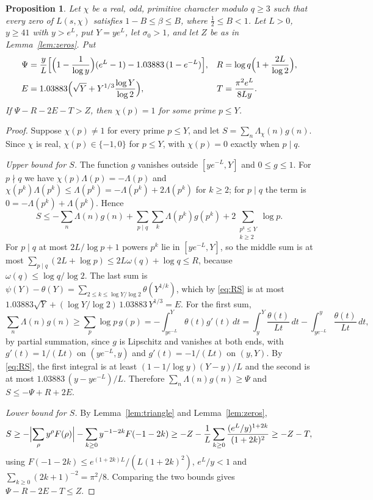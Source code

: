 \documentclass[11pt]{amsart}
\newtheorem{proposition}[theorem]{Proposition}
\theoremstyle{definition}
\theoremstyle{remark}
\numberwithin{equation}{section}
\newcommand{\Lam}{\Lambda_\chi}
\begin{document}
\begin{proposition}\label{prop:criterion}
Let $\chi$ be a real, odd, primitive character modulo $q\ge3$ such that every zero of $L(s,\chi)$ satisfies $1-B\le\beta\le B$, where $\tfrac12\le B<1$. Let $L>0$, $y\ge41$ with $y>e^L$, put $Y=ye^L$, let $\sigma_0>1$, and let $Z$ be as in Lemma~\ref{lem:zeros}. Put
\begin{align*}
\Psi&=\frac yL\Bigl[\Bigl(1-\frac1{\log y}\Bigr)(e^L-1)-1.03883\,(1-e^{-L})\Bigr],&
R&=\log q\Bigl(1+\frac{2L}{\log2}\Bigr),\\
E&=1.03883\Bigl(\sqrt Y+Y^{1/3}\frac{\log Y}{\log 2}\Bigr),&
T&=\frac{\pi^2e^L}{8Ly}.
\end{align*}
If $\Psi-R-2E-T>Z$, then $\chi(p)=1$ for some prime $p\le Y$.
\end{proposition}

\begin{proof}
Suppose $\chi(p)\neq1$ for every prime $p\le Y$, and let $S=\sum_n\Lam(n)g(n)$. Since $\chi$ is real, $\chi(p)\in\{-1,0\}$ for $p\le Y$, with $\chi(p)=0$ exactly when $p\mid q$.

\emph{Upper bound for $S$.} The function $g$ vanishes outside $[ye^{-L},Y]$ and $0\le g\le1$. For $p\nmid q$ we have $\chi(p)\Lambda(p)=-\Lambda(p)$ and $\chi(p^k)\Lambda(p^k)\le\Lambda(p^k)=-\Lambda(p^k)+2\Lambda(p^k)$ for $k\ge2$; for $p\mid q$ the term is $0=-\Lambda(p^k)+\Lambda(p^k)$. Hence
\[
S\le-\sum_n\Lambda(n)g(n)+\sum_{p\mid q}\sum_{k}\Lambda(p^k)g(p^k)+2\sum_{\substack{p^k\le Y\\k\ge2}}\log p .
\]
For $p\mid q$ at most $2L/\log p+1$ powers $p^k$ lie in $[ye^{-L},Y]$, so the middle sum is at most $\sum_{p\mid q}(2L+\log p)\le 2L\omega(q)+\log q\le R$, because $\omega(q)\le\log q/\log 2$. The last sum is $\psi(Y)-\theta(Y)=\sum_{2\le k\le\log Y/\log2}\theta(Y^{1/k})$, which by \eqref{eq:RS} is at most $1.03883\sqrt Y+(\log Y/\log 2)\,1.03883\,Y^{1/3}=E$. For the first sum,
\[
\sum_n\Lambda(n)g(n)\ge\sum_p\log p\,g(p)=-\int_{ye^{-L}}^{Y}\theta(t)g'(t)\,dt=\int_y^Y\frac{\theta(t)}{Lt}\,dt-\int_{ye^{-L}}^y\frac{\theta(t)}{Lt}\,dt ,
\]
by partial summation, since $g$ is Lipschitz and vanishes at both ends, with $g'(t)=1/(Lt)$ on $(ye^{-L},y)$ and $g'(t)=-1/(Lt)$ on $(y,Y)$. By \eqref{eq:RS}, the first integral is at least $(1-1/\log y)(Y-y)/L$ and the second is at most $1.03883\,(y-ye^{-L})/L$. Therefore $\sum_n\Lambda(n)g(n)\ge\Psi$ and $S\le-\Psi+R+2E$.

\emph{Lower bound for $S$.} By Lemma~\ref{lem:triangle} and Lemma~\ref{lem:zeros},
\[
S\ge-\Bigl|\sum_\rho y^\rho F(\rho)\Bigr|-\sum_{k\ge0}y^{-1-2k}F(-1-2k)\ge-Z-\frac1L\sum_{k\ge0}\frac{(e^L/y)^{1+2k}}{(1+2k)^2}\ge-Z-T,
\]
using $F(-1-2k)\le e^{(1+2k)L}/(L(1+2k)^2)$, $e^L/y<1$ and $\sum_{k\ge0}(2k+1)^{-2}=\pi^2/8$. Comparing the two bounds gives $\Psi-R-2E-T\le Z$.
\end{proof}
\end{document}
